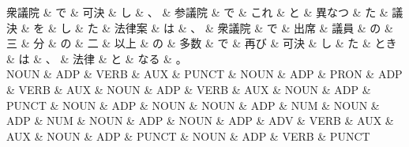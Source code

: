 \documentclass[tikz,border=5pt]{standalone}
\begin{document}
\small
\begin{dependency}[edge unit distance=12.0pt]
    \begin{deptext}[column sep=0.5em]
        衆議院 \& で \& 可決 \& し \& 、 \& 参議院 \& で \& これ \& と \& 異なつ \& た \& 議決 \& を \& し \& た \& 法律案 \& は \& 、 \& 衆議院 \& で \& 出席 \& 議員 \& の \& 三 \& 分 \& の \& 二 \& 以上 \& の \& 多数 \& で \& 再び \& 可決 \& し \& た \& とき \& は \& 、 \& 法律 \& と \& なる \& 。\\
        NOUN \& ADP \& VERB \& AUX \& PUNCT \& NOUN \& ADP \& PRON \& ADP \& VERB \& AUX \& NOUN \& ADP \& VERB \& AUX \& NOUN \& ADP \& PUNCT \& NOUN \& ADP \& NOUN \& NOUN \& ADP \& NUM \& NOUN \& ADP \& NUM \& NOUN \& ADP \& NOUN \& ADP \& ADV \& VERB \& AUX \& AUX \& NOUN \& ADP \& PUNCT \& NOUN \& ADP \& VERB \& PUNCT\\
    \end{deptext}
\end{dependency}
\end{document}
